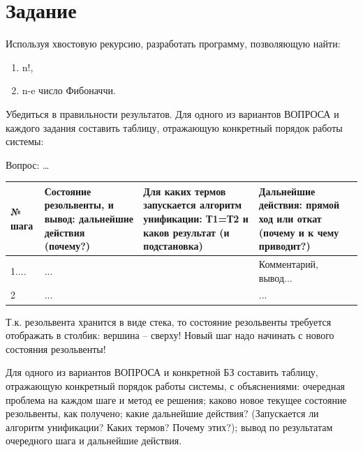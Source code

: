 \section{Задание}

Используя хвостовую рекурсию, разработать программу, позволяющую найти:

\begin{enumerate}
	\item n!,
	\item n-e число Фибоначчи.
\end{enumerate}

Убедиться в правильности результатов. Для одного из вариантов ВОПРОСА и каждого задания составить таблицу, отражающую конкретный порядок работы системы:

Вопрос: \dots

\begin{tabularx}{\textwidth}{|p{1.1cm}|X|X|X|}
	\hline
	№ шага & Состояние резольвенты, и вывод: дальнейшие действия (почему?) & Для каких термов запускается алгоритм унификации: Т1=Т2 и каков результат (и подстановка) & Дальнейшие действия: прямой ход или откат (почему и к чему приводит?) \\
	\hline
	1....  & ...                                                           &                                                                                           & Комментарий, вывод...                                                 \\
	\hline
	2      & ...                                                           &                                                                                           & ...                                                                   \\
	\hline
\end{tabularx}

Т.к. резольвента хранится в виде стека, то состояние резольвенты требуется отображать в столбик: вершина -- сверху! Новый шаг надо начинать с нового состояния резольвенты!

Для одного из вариантов ВОПРОСА и конкретной БЗ составить таблицу, отражающую конкретный порядок работы системы, с объяснениями: очередная проблема на каждом шаге и метод ее решения; каково новое текущее состояние резольвенты, как получено; какие дальнейшие действия? (Запускается ли алгоритм унификации? Каких термов? Почему этих?); вывод по результатам очередного шага и дальнейшие действия.

